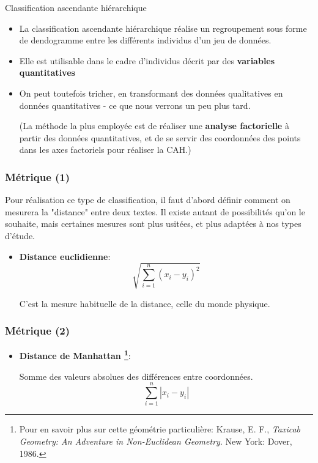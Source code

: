 \documentclass{beamer}
\begin{document}
\begin{frame}{Classification ascendante hiérarchique}


\begin{itemize}
	\item La \alert{classification ascendante hiérarchique}  réalise un regroupement sous forme de dendogramme entre les différents individus d'un jeu de données.
	\item Elle est utilisable dans le cadre d'individus décrit par des \textbf{variables quantitatives}
	\item On peut toutefois tricher, en transformant des données qualitatives en données quantitatives - ce que nous verrons un peu plus tard.
	
	(La méthode la plus employée est de réaliser une \textbf{analyse factorielle} à partir des données quantitatives, et de se servir des coordonnées des points dans les axes factoriels pour réaliser la CAH.)
	
\end{itemize}

\end{frame}

\begin{frame}[fragile]
\frametitle{Métrique (1)}

Pour réalisation ce type de classification, il faut d'abord définir comment on mesurera la "distance" entre deux textes. Il existe autant de possibilités qu'on le souhaite, mais certaines mesures sont plus usitées, et plus adaptées à nos types d'étude.

\begin{itemize}
\item \textbf{Distance euclidienne}:
\[
\sqrt{\sum_{i=1}^{n} \left( x_{i}-y_{i}\right)^{2}}
\]

C'est la mesure habituelle de la distance, celle du monde physique.  

\end{itemize}

\end{frame}

\begin{frame}[fragile]
\frametitle{Métrique (2)}

\begin{itemize}
\item \textbf{Distance de Manhattan \footnote{Pour en savoir plus sur cette géométrie particulière: Krause, E. F., \textit{Taxicab Geometry: An Adventure in Non-Euclidean Geometry}. New York: Dover, 1986. }}:

Somme des valeurs absolues des différences entre coordonnées.
\[
\sum_{i=1}^{n} |x_{i}-y_{i}|
\]



\end{itemize}

\end{frame}
\end{document}
